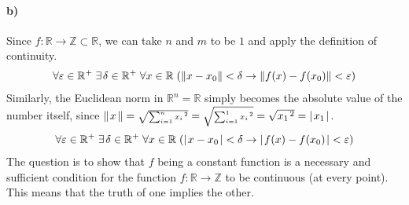 \documentclass[12pt]{article}
\newcommand\+{\mkern2mu}
\let\eps\varepsilon
\begin{document}
\newpage

\paragraph{b)}
Since $f: \mathbb{R} \rightarrow \mathbb{Z} \subset \mathbb{R}$, we can take $n$ and $m$ to be $1$ and apply the definition of continuity.
\begin{gather*}
\forall \eps \in \mathbb{R}^+ \; \exists \+ \delta \in \mathbb{R}^+ \; \forall x \in \mathbb{R} \; (\Vert x - x_0 \Vert < \delta \rightarrow \Vert f(x) - f(x_0) \Vert < \eps)
\end{gather*}
Similarly, the Euclidean norm in $\mathbb{R}^n = \mathbb{R}$ simply becomes the absolute value of the number itself, since $\Vert \+ x \+ \Vert = \sqrt{\scriptstyle\sum_{i = 1}^{n} x_i \+ ^2} = \sqrt{\scriptstyle\sum_{i = 1}^{1}x_i \+ ^2} = \sqrt{x_1 \+ ^2} = \vert \+ x_1 \+ \vert$.
\begin{gather*}
\forall \eps \in \mathbb{R}^+ \; \exists \+ \delta \in \mathbb{R}^+ \; \forall x \in \mathbb{R} \; (\vert \+ x - x_0 \+ \vert < \delta \rightarrow \vert \+ f(x) - f(x_0) \+ \vert < \eps)
\end{gather*}
The question is to show that $f$ being a constant function is a necessary and sufficient condition for the function $f: \mathbb{R} \rightarrow \mathbb{Z}$ to be continuous (at every point).
This means that the truth of one implies the other.
\end{document}

